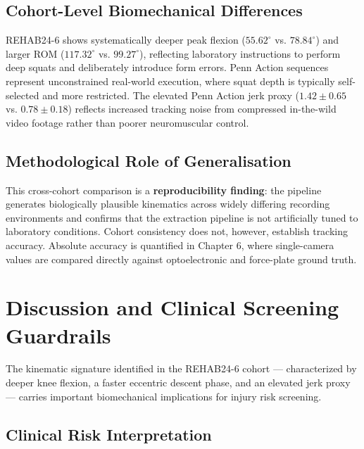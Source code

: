 \subsection{Cohort-Level Biomechanical Differences}
\label{sec:4-3-1-cohort-level-biomechanical-differences}

REHAB24-6 shows systematically deeper peak flexion ($55.62^\circ$ vs. $78.84^\circ$) and larger ROM ($117.32^\circ$ vs. $99.27^\circ$), reflecting laboratory instructions to perform deep squats and deliberately introduce form errors. Penn Action sequences represent unconstrained real-world execution, where squat depth is typically self-selected and more restricted. The elevated Penn Action jerk proxy ($1.42 \pm 0.65$ vs. $0.78 \pm 0.18$) reflects increased tracking noise from compressed in-the-wild video footage rather than poorer neuromuscular control.

\subsection{Methodological Role of Generalisation}
\label{sec:4-3-2-methodological-role-of-generalisation}

This cross-cohort comparison is a \textbf{reproducibility finding}: the pipeline generates biologically plausible kinematics across widely differing recording environments and confirms that the extraction pipeline is not artificially tuned to laboratory conditions. Cohort consistency does not, however, establish tracking accuracy. Absolute accuracy is quantified in Chapter 6, where single-camera values are compared directly against optoelectronic and force-plate ground truth.



\section{Discussion and Clinical Screening Guardrails}
\label{sec:4-4-discussion-and-clinical-screening-guardrails}


The kinematic signature identified in the REHAB24-6 cohort — characterized by deeper knee flexion, a faster eccentric descent phase, and an elevated jerk proxy — carries important biomechanical implications for injury risk screening.

\subsection{Clinical Risk Interpretation}
\label{sec:4-4-1-clinical-risk-interpretation}

